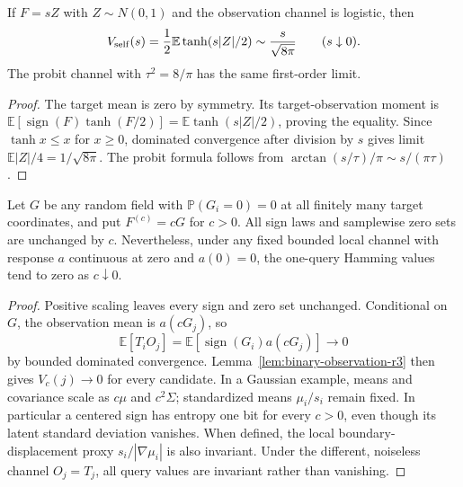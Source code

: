 \begin{proposition}
If $F=sZ$ with $Z\sim N(0,1)$ and the observation channel is logistic,
then
\[
 V_{\rm self}(s)=\frac12\mathbb{E}\tanh(s|Z|/2)
 \sim \frac{s}{\sqrt{8\pi}}\qquad(s\downarrow0).
\]
The probit channel with $\tau^2=8/\pi$ has the same first-order limit.
\end{proposition}
\begin{proof}
The target mean is zero by symmetry. Its target-observation moment is
$\mathbb{E}[\operatorname{sign}(F)\tanh(F/2)]
=\mathbb{E}\tanh(s|Z|/2)$, proving the equality.
Since $\tanh x\le x$ for $x\ge0$, dominated convergence after division by
$s$ gives limit $\mathbb{E}|Z|/4=1/\sqrt{8\pi}$.
The probit formula follows from
$\arctan(s/\tau)/\pi\sim s/(\pi\tau)$.
\end{proof}

\begin{counterexample}
\label{ce:scale-gauge-r3}
Let $G$ be any random field with
$\mathbb{P}(G_i=0)=0$ at all finitely many target coordinates, and put
$F^{(c)}=cG$ for $c>0$. All sign laws and samplewise zero sets are
unchanged by $c$. Nevertheless, under any fixed bounded local channel
with response $a$ continuous at zero and $a(0)=0$, the one-query
Hamming values tend to zero as $c\downarrow0$.
\end{counterexample}
\begin{proof}
Positive scaling leaves every sign and zero set unchanged. Conditional
on $G$, the observation mean is $a(cG_j)$, so
\[
 \mathbb{E}[T_iO_j]
 =\mathbb{E}[\operatorname{sign}(G_i)a(cG_j)]
 \longrightarrow0
\]
by bounded dominated convergence. Lemma~\ref{lem:binary-observation-r3}
then gives $V_c(j)\to0$ for every candidate. In a Gaussian example,
means and covariance scale as $c\mu$ and $c^2\Sigma$; standardized means
$\mu_i/s_i$ remain fixed. In particular a centered sign has entropy one
bit for every $c>0$, even though its latent standard deviation vanishes.
When defined, the local boundary-displacement proxy
$s_i/|\nabla\mu_i|$ is also invariant. Under the different, noiseless
channel $O_j=T_j$, all query values are invariant rather than vanishing.
\end{proof}

